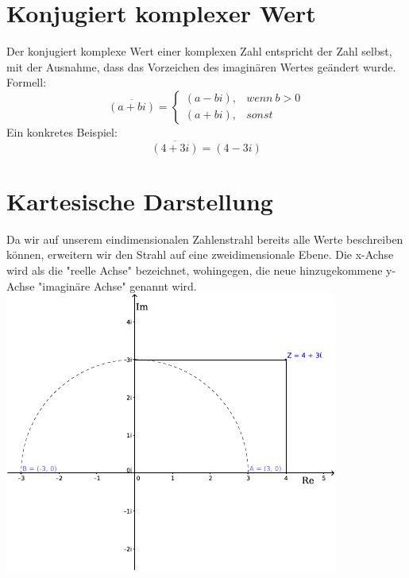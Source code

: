 \documentclass[12pt,a4paper]{scrbook}
\begin{document}
\section{Konjugiert komplexer Wert}
Der konjugiert komplexe Wert einer komplexen Zahl entspricht der Zahl selbst,
mit der Ausnahme, dass das Vorzeichen des imaginären Wertes geändert wurde. Formell:
\[\overline{(a+bi)} = \left\lbrace \begin{array}{ll} (a-bi), & wenn~b > 0\\ (a+bi), & sonst \end{array} \right.\]
Ein konkretes Beispiel:
\[\overline{(4+3i)} = (4-3i)\]

\section{Kartesische Darstellung}
Da wir auf unserem eindimensionalen Zahlenstrahl bereits alle Werte
beschreiben können, erweitern wir den Strahl auf eine zweidimensionale
Ebene. Die x-Achse wird als die "reelle Achse" bezeichnet, wohingegen,
die neue hinzugekommene y-Achse "imaginäre Achse" genannt wird.\\
\includegraphics[scale=1.9]{img/komplexe_zahlen.pdf}
\end{document}

